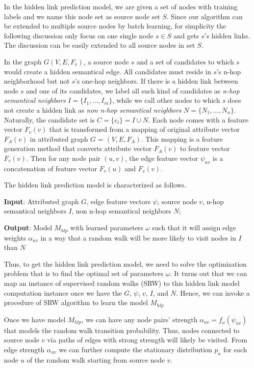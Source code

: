 In the hidden link prediction model, we are given a set of nodes with training labels and we name this node set as source node set $S$. Since our algorithm can be extended to multiple source nodes by batch learning, for simplicity the following discussion only focus on one single node $s \in S$ and gets $s'$s hidden links. The discussion can be easily extended to all source nodes in set $S$.

In the graph $G(V,E,F_v)$, a source node 
$s$ and a set of candidates to which $s$ would create a hidden semantical edge. All candidates must reside in $s$'s n-hop neighborhood but not $s$'s one-hop neighbors. If there is a hidden link between node $s$ and one of its candidates, we label all such kind of candidates as {\em n-hop semantical neighbors} ${I = \{I_1, ..., I_m\}}$, while we call other nodes to which $s$ does not create a hidden link as {\em non n-hop semantical neighbors} ${N =\{N_1, ..., N_n\}}$. Naturally, the candidate set is $C = \{c_i\} = I \cup N$. Each node comes with a feature vector $F_v(v)$ that is transformed from a mapping of original attribute vector $F_A(v)$ in attributed graph $G$ = $(V,E,F_A)$. This mapping is a feature generation method that converts attribute vector $F_A(v)$ to feature vector $F_v(v)$. Then for any node pair $(u,v)$, the edge feature vector $\psi_{uv}$ is a concatenation of feature vector $F_v(u)$ and $F_v(v)$. 

The hidden link prediction model is characterized as follows.
\tbi
\item \textbf{Input}: Attributed graph $G$, edge feature vectors $\psi$, source node $v$, n-hop semantical neighbors $I$, non n-hop semantical neighbors $N$;
\item \textbf{Output}: Model $M_{hlp}$ with learned parameters $\omega$ such that it will assign edge weights $\alpha_{uv}$ in a way that a random walk will be more likely to visit nodes in $I$ than $N$
\ei

Thus, to get the hidden link prediction model, we need to solve the optimization problem that is to find the optimal set of parameters $\omega$. It turns out that we can map an instance of supervised random walks (SRW) \cite{backstrom2011supervised} to this hidden link model computation instance once we have the $G$, $\psi$, $v$, $I$, and $N$. Hence, we can invoke a procedure of SRW algorithm to learn the model $M_{hlp}$ 

Once we have model $M_{hlp}$, we can have any node pairs' strength ${\alpha_{uv} = f_\omega(\psi_{uv})}$ that models the random walk transition probability. Thus, nodes connected to source node $v$ via paths of edges with strong strength will likely be visited. From edge strength $\alpha_{uv}$ we can further compute the stationary distribution $p_u$ for each node $u$ of the random walk starting from source node $v$.

